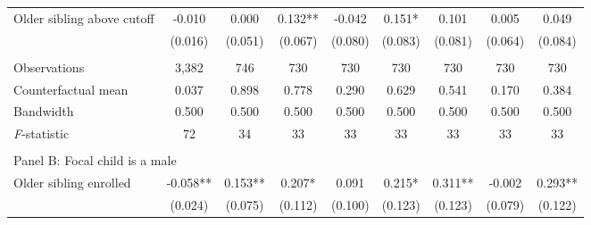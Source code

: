 \begin{table}[!htbp]
{{\begin{tabular}{lcccccccc}
Older sibling above cutoff&      -0.010   &       0.000   &       0.132** &      -0.042   &       0.151*  &       0.101   &       0.005   &       0.049   \\
                    &     (0.016)   &     (0.051)   &     (0.067)   &     (0.080)   &     (0.083)   &     (0.081)   &     (0.064)   &     (0.084)   \\
                    &               &               &               &               &               &               &               &               \\
Observations        &       3,382   &         746   &         730   &         730   &         730   &         730   &         730   &         730   \\
Counterfactual mean &       0.037   &       0.898   &       0.778   &       0.290   &       0.629   &       0.541   &       0.170   &       0.384   \\
Bandwidth           &       0.500   &       0.500   &       0.500   &       0.500   &       0.500   &       0.500   &       0.500   &       0.500   \\
\textit{F}-statistic&          72   &          34   &          33   &          33   &          33   &          33   &          33   &          33   \\
 
&  &  &  &  \\
\multicolumn{10}{l}{Panel B: Focal child is a male} \\
Older sibling enrolled&      -0.058** &       0.153** &       0.207*  &       0.091   &       0.215*  &       0.311** &      -0.002   &       0.293** \\
                    &     (0.024)   &     (0.075)   &     (0.112)   &     (0.100)   &     (0.123)   &     (0.123)   &     (0.079)   &     (0.122)   \\
 

\end{tabular}}}
\end{table}
